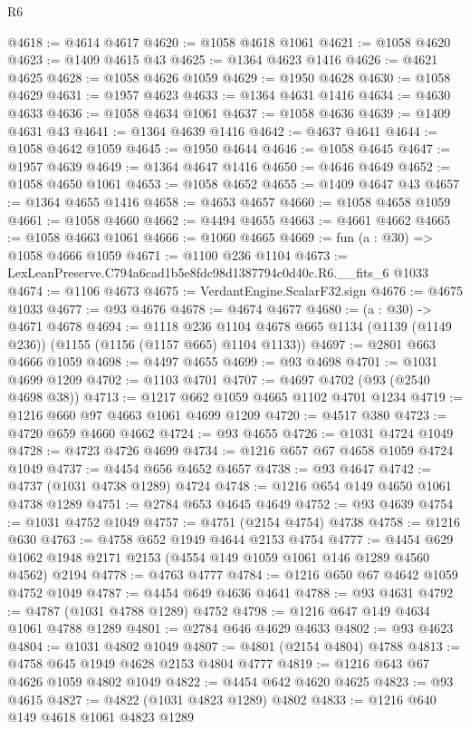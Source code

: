 \begin{lexlean}{R6}
\begin{coremodule}
@4618 := @4614 @4617
@4620 := @1058 @4618 @1061
@4621 := @1058 @4620
@4623 := @1409 @4615 @43
@4625 := @1364 @4623 @1416
@4626 := @4621 @4625
@4628 := @1058 @4626 @1059
@4629 := @1950 @4628
@4630 := @1058 @4629
@4631 := @1957 @4623
@4633 := @1364 @4631 @1416
@4634 := @4630 @4633
@4636 := @1058 @4634 @1061
@4637 := @1058 @4636
@4639 := @1409 @4631 @43
@4641 := @1364 @4639 @1416
@4642 := @4637 @4641
@4644 := @1058 @4642 @1059
@4645 := @1950 @4644
@4646 := @1058 @4645
@4647 := @1957 @4639
@4649 := @1364 @4647 @1416
@4650 := @4646 @4649
@4652 := @1058 @4650 @1061
@4653 := @1058 @4652
@4655 := @1409 @4647 @43
@4657 := @1364 @4655 @1416
@4658 := @4653 @4657
@4660 := @1058 @4658 @1059
@4661 := @1058 @4660
@4662 := @4494 @4655
@4663 := @4661 @4662
@4665 := @1058 @4663 @1061
@4666 := @1060 @4665
@4669 := fun (a : @30) => @1058 @4666 @1059
@4671 := @1100 @236 @1104
@4673 := LexLeanPreserve.C794a6cad1b5e8fdc98d1387794c0d40c.R6.__fits_6 @1033
@4674 := @1106 @4673
@4675 := VerdantEngine.ScalarF32.sign
@4676 := @4675 @1033
@4677 := @93 @4676
@4678 := @4674 @4677
@4680 := (a : @30) -> @4671 @4678
@4694 := @1118
    @236
    @1104
    @4678
    @665
    @1134
    (@1139 (@1149 @236))
    (@1155 (@1156 (@1157 @665) @1104 @1133))
@4697 := @2801 @663 @4666 @1059
@4698 := @4497 @4655
@4699 := @93 @4698
@4701 := @1031 @4699 @1209
@4702 := @1103 @4701
@4707 := @4697 @4702 (@93 (@2540 @4698 @38))
@4713 := @1217 @662 @1059 @4665 @1102 @4701 @1234
@4719 := @1216 @660 @97 @4663 @1061 @4699 @1209
@4720 := @4517 @380
@4723 := @4720 @659 @4660 @4662
@4724 := @93 @4655
@4726 := @1031 @4724 @1049
@4728 := @4723 @4726 @4699
@4734 := @1216 @657 @67 @4658 @1059 @4724 @1049
@4737 := @4454 @656 @4652 @4657
@4738 := @93 @4647
@4742 := @4737 (@1031 @4738 @1289) @4724
@4748 := @1216 @654 @149 @4650 @1061 @4738 @1289
@4751 := @2784 @653 @4645 @4649
@4752 := @93 @4639
@4754 := @1031 @4752 @1049
@4757 := @4751 (@2154 @4754) @4738
@4758 := @1216 @630
@4763 := @4758 @652 @1949 @4644 @2153 @4754
@4777 := @4454 @629 @1062 @1948 @2171 @2153 (@4554 @149 @1059 @1061 @146 @1289 @4560 @4562) @2194
@4778 := @4763 @4777
@4784 := @1216 @650 @67 @4642 @1059 @4752 @1049
@4787 := @4454 @649 @4636 @4641
@4788 := @93 @4631
@4792 := @4787 (@1031 @4788 @1289) @4752
@4798 := @1216 @647 @149 @4634 @1061 @4788 @1289
@4801 := @2784 @646 @4629 @4633
@4802 := @93 @4623
@4804 := @1031 @4802 @1049
@4807 := @4801 (@2154 @4804) @4788
@4813 := @4758 @645 @1949 @4628 @2153 @4804 @4777
@4819 := @1216 @643 @67 @4626 @1059 @4802 @1049
@4822 := @4454 @642 @4620 @4625
@4823 := @93 @4615
@4827 := @4822 (@1031 @4823 @1289) @4802
@4833 := @1216 @640 @149 @4618 @1061 @4823 @1289

\end{coremodule}
\end{lexlean}
